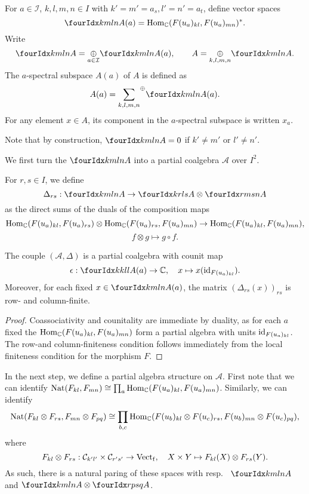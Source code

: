 \begin{Def} For $a\in \mathcal{I}$, $k,l,m,n\in I$ with $k'=m'=a_s,l'=n'=a_t$, define vector spaces \[\Gr{A}{k}{l}{m}{n}(a) = \Hom_{\C}(\Forget(u_a)_{kl},\Forget(u_a)_{mn})^*.\] Write \[\Gr{A}{k}{l}{m}{n} = \underset{a\in \mathcal{I}}{\oplus} \Gr{A}{k}{l}{m}{n}(a),\qquad A = \underset{k,l,m,n}{\oplus} \Gr{A}{k}{l}{m}{n}.\] The $a$-spectral subspace $A(a)$ of $A$ is defined as \[A(a) = \osum{k,l,m,n} \Gr{A}{k}{l}{m}{n}(a).\] For any element $x\in A$, its component in the $a$-spectral subspace is written $x_a$.
\end{Def} 

Note that by construction, $\Gr{A}{k}{l}{m}{n}=0$ if $k'\neq m'$ or $l'\neq n'$. 

We first turn the $\Gr{A}{k}{l}{m}{n}$ into a partial coalgebra $\mathscr{A}$ over $I^2$.

\begin{Def} For $r,s\in I$, we define \[\Delta_{rs}: \Gr{A}{k}{l}{m}{n}\rightarrow \Gr{A}{k}{l}{r}{s}\otimes \Gr{A}{r}{s}{m}{n}\] as the direct sums of the duals of the composition maps \[\operatorname{Hom}_{\mathbb{C}}(F(u_a)_{kl},F(u_a)_{rs}) \otimes \operatorname{Hom}_{\mathbb{C}}(F(u_a)_{rs},F(u_a)_{mn})\rightarrow \operatorname{Hom}_{\mathbb{C}}(F(u_a)_{kl},F(u_a)_{mn}),\]\[f\otimes g \mapsto g\circ f.\]
\end{Def} 

\begin{Lem} The couple $(\mathscr{A},\Delta)$ is a partial coalgebra with counit map \[\epsilon:\Gr{A(a)}{k}{l}{k}{l}\rightarrow \C,\quad x\mapsto x(\id_{\Forget(u_a)_{kl}}).\] Moreover, for each fixed $x\in \Gr{A(a)}{k}{l}{m}{n}$, the matrix $\left(\Delta_{rs}(x)\right)_{rs}$ is row- and column-finite.
\end{Lem} 
\begin{proof} Coassociativity and counitality are immediate by duality, as for each $a$ fixed the $\operatorname{Hom}_{\mathbb{C}}(F(u_a)_{kl},F(u_a)_{mn})$ form a partial algebra with units $\operatorname{id}_{F(u_a)_{kl}}$. The row-and column-finiteness condition follows immediately from the local finiteness condition for the morphism $F$.
\end{proof}

In the next step, we define a partial algebra structure on $\mathscr{A}$. %
First note that we can identify $\operatorname{\mathrm{Nat}}(F_{kl},F_{mn}) \cong \prod_a \operatorname{Hom}_{\mathbb{C}}(F(u_a)_{kl},F(u_a)_{mn})$. Similarly, we can identify \[\operatorname{\mathrm{Nat}}(F_{kl}\otimes F_{rs},F_{mn}\otimes F_{pq}) \cong  \prod_{b,c} \operatorname{Hom}_{\mathbb{C}}(F(u_b)_{kl}\otimes F(u_c)_{rs} ,F(u_b)_{mn}\otimes F(u_c)_{pq}),\] where \[F_{kl}\otimes F_{rs}:\mathcal{C}_{k'l'}\times \mathcal{C}_{r's'}\rightarrow \mathrm{Vect}_{\operatorname{\mathrm{f}}},\quad X\times Y \mapsto F_{kl}(X)\otimes F_{rs}(Y).\] As such, there is a natural paring of these spaces with resp.~ $\Gr{A}{k}{l}{m}{n}$ and $\Gr{A}{k}{l}{m}{n}\otimes \Gr{A}{r}{s}{p}{q}$. 

